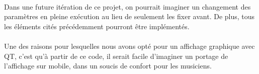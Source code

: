 \paragraph{}
Dans une future itération de ce projet, on pourrait imaginer un changement des paramètres en pleine exécution au lieu de seulement les fixer avant. De plus, tous les éléments cités précédemment pourront être implémentés.
\paragraph{}
Une des raisons pour lesquelles nous avons opté pour un affichage graphique avec QT, c'est qu'à partir de ce code, il serait facile d'imaginer un portage de l'affichage sur mobile, dans un soucis de confort pour les musiciens.
